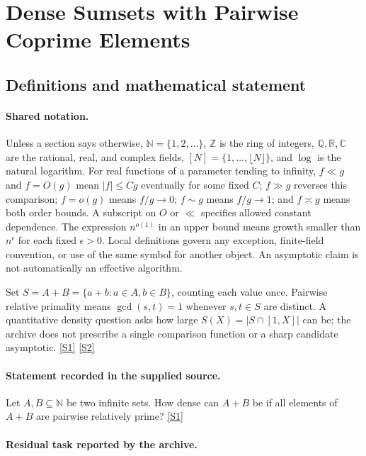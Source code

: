 \documentclass[11pt,a4paper]{article}
\newcommand{\N}{\mathbb{N}}
\newcommand{\Z}{\mathbb{Z}}
\newcommand{\Q}{\mathbb{Q}}
\newcommand{\R}{\mathbb{R}}
\newcommand{\C}{\mathbb{C}}
\newcommand{\sref}[2]{\hyperlink{source:#1:#2}{[S#2]}}
\begin{document}
\section{Dense Sumsets with Pairwise Coprime Elements}\label{statement}


\subsection{Definitions and mathematical statement}

\paragraph{Shared notation.}Unless a section says otherwise, $\N=\{1,2,\ldots\}$,
$\Z$ is the ring of integers, $\Q,\R,\C$ are the rational, real, and complex
fields, $[N]=\{1,\ldots,\lfloor N\rfloor\}$, and $\log$ is the natural
logarithm. For real functions of a parameter tending to infinity,
$f\ll g$ and $f=O(g)$ mean $|f|\leq Cg$ eventually for some fixed $C$;
$f\gg g$ reverses this comparison; $f=o(g)$ means $f/g\to0$;
$f\sim g$ means $f/g\to1$; and $f\asymp g$ means both order bounds.
A subscript on $O$ or $\ll$ specifies allowed constant dependence.
The expression $n^{o(1)}$ in an upper bound means growth smaller than
$n^\epsilon$ for each fixed $\epsilon>0$. Local definitions govern any
exception, finite-field convention, or use of the same symbol for another
object. An asymptotic claim is not automatically an effective algorithm.



Set $S=A+B=\{a+b:a\in A,b\in B\}$, counting each value once. Pairwise relative primality means $\gcd(s,t)=1$ whenever $s,t\in S$ are distinct. A quantitative density question asks how large $S(X)=|S\cap[1,X]|$ can be; the archive does not prescribe a single comparison function or a sharp candidate asymptotic. \sref{statement}{1} \sref{statement}{2}

\paragraph{Statement recorded in the supplied source.}
Let $A,B\subseteq \mathbb{N}$ be two infinite sets. How dense can $A+B$ be if all elements of $A+B$ are pairwise relatively prime? \sref{statement}{1}

\paragraph{Residual task reported by the archive.}
\end{document}
